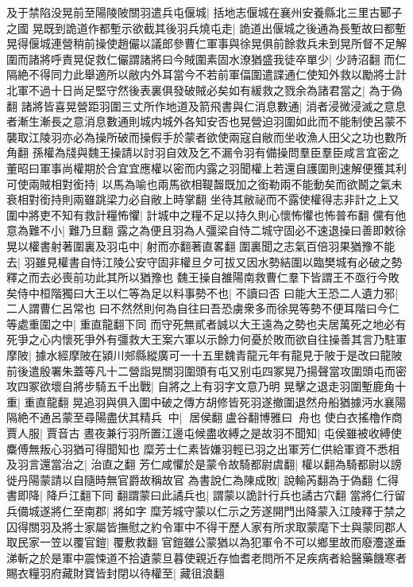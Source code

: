 及于禁陷没晃前至陽陵陂關羽遣兵屯偃城|{
	括地志偃城在襄州安養縣北三里古郾子之國}
晃既到詭道作都塹示欲截其後羽兵燒屯走|{
	詭道出偃城之後通為長塹故曰都塹}
晃得偃城連營稍前操使趙儼以議郎參曹仁軍事與徐晃俱前餘救兵未到晃所督不足解圍而諸將呼責晃促救仁儼謂諸將曰今賊圍素固水潦猶盛我徒卒單少|{
	少詩沼翻}
而仁隔絶不得同力此舉適所以敝内外耳當今不若前軍偪圍遣諜通仁使知外救以勵將士計北軍不過十日尚足堅守然後表裏俱發破賊必矣如有緩救之戮余為諸君當之|{
	為于偽翻}
諸將皆喜晃營距羽圍三丈所作地道及箭飛書與仁消息數通|{
	消者浸微浸滅之意息者漸生漸長之意消息數通則城内城外各知安否也晃營迫羽圍如此而不能制使呂蒙不襲取江陵羽亦必為操所破而操假手於蒙者欲使兩寇自敝而坐收漁人田父之功也數所角翻}
孫權為牋與魏王操請以討羽自效及乞不漏令羽有備操問羣臣羣臣咸言宜密之董昭曰軍事尚權期於合宜宜應權以密而内露之羽聞權上若還自護圍則速解便獲其利可使兩賊相對銜持|{
	以馬為喻也兩馬欲相鞮齧既加之銜勒兩不能動矣而欲鬭之氣未衰相對銜持則兩雖跳梁力必自敝上時掌翻}
坐待其敝祕而不露使權得志非計之上又圍中將吏不知有救計糧怖懼|{
	計城中之糧不足以持久則心懷怖懼也怖普布翻}
儻有他意為難不小|{
	難乃旦翻}
露之為便且羽為人彊梁自恃二城守固必不速退操曰善即敕徐晃以權書射著圍裏及羽屯中|{
	射而亦翻著直畧翻}
圍裏聞之志氣百倍羽果猶豫不能去|{
	羽雖見權書自恃江陵公安守固非權旦夕可拔又因水勢結圍以臨樊城有必破之勢釋之而去必喪前功此其所以猶豫也}
魏王操自雒陽南救曹仁羣下皆謂王不亟行今敗矣侍中桓階獨曰大王以仁等為足以料事勢不也|{
	不讀曰否}
曰能大王恐二人遺力邪|{
	二人謂曹仁呂常也}
曰不然然則何為自往曰吾恐虜衆多而徐晃等勢不便耳階曰今仁等處重圍之中|{
	重直龍翻下同}
而守死無貳者誠以大王遠為之勢也夫居萬死之地必有死爭之心内懷死爭外有彊救大王案六軍以示餘力何憂於敗而欲自往操善其言乃駐軍摩陂|{
	據水經摩陂在潁川郟縣縱廣可一十五里魏青龍元年有龍見于陂于是改曰龍陂}
前後遣殷署朱蓋等凡十二營詣晃關羽圍頭有屯又别屯四冢晃乃揚聲當攻圍頭屯而密攻四冢欲壞自將步騎五千出戰|{
	自將之上有羽字文意乃明}
晃擊之退走羽圍塹鹿角十重|{
	重直龍翻}
晃追羽與俱入圍中破之傳方胡修皆死羽遂撤圍退然舟船猶據沔水襄陽隔絶不通呂蒙至尋陽盡伏其精兵中|{
	居侯翻盧谷翻博雅曰舟也}
使白衣搖櫓作商賈人服|{
	賈音古}
晝夜兼行羽所置江邊屯候盡收縛之是故羽不聞知|{
	屯侯雖被收縛使麋傅無叛心羽猶可得聞知也}
糜芳士仁素皆嫌羽輕已羽之出軍芳仁供給軍資不悉相及羽言還當治之|{
	治直之翻}
芳仁咸懼於是蒙令故騎都尉虞翻|{
	權以翻為騎都尉以謗徙丹陽蒙請以自隨時無官爵故稱故官}
為書說仁為陳成敗|{
	說輸芮翻為于偽翻}
仁得書即降|{
	降戶江翻下同}
翻謂蒙曰此譎兵也|{
	謂蒙以詭計行兵也譎古穴翻}
當將仁行留兵備城遂將仁至南郡|{
	將如字}
糜芳城守蒙以仁示之芳遂開門出降蒙入江陵釋于禁之囚得關羽及將士家屬皆撫慰之約令軍中不得干歷人家有所求取蒙麾下士與蒙同郡人取民家一笠以覆官鎧|{
	覆敷救翻}
官鎧雖公蒙猶以為犯軍令不可以鄉里故而廢灋遂垂涕斬之於是軍中震悚道不拾遺蒙旦暮使親近存恤耆老問所不足疾病者給醫藥饑寒者賜衣糧羽府藏財寶皆封閉以待權至|{
	藏徂浪翻}

